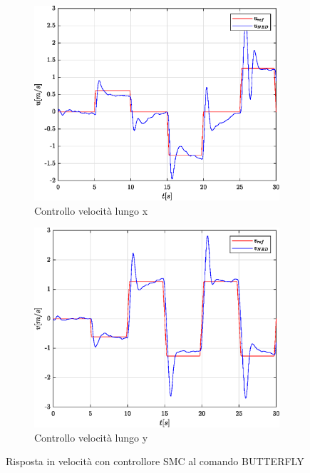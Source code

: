 \begin{figure}
	\centering
	\begin{subfigure}{0.45\textwidth}
		\centering
		\includegraphics[width=1\textwidth]{Simulazioni/Figure/SMC/BUTTERFLY/PositionControlXVel}
		\caption{Controllo velocità lungo x}
		\label{fig:BUTTERFLYerrvelxSMC}
	\end{subfigure}
	\hfill
	\begin{subfigure}{0.45\textwidth}
		\centering
		\includegraphics[width=1\textwidth]{Simulazioni/Figure/SMC/BUTTERFLY/PositionControlYVel}
		\caption{Controllo velocità lungo y}
		\label{fig:BUTTERFLYerrvelySMC}
	\end{subfigure}
	\caption{Risposta in velocità con controllore SMC al comando BUTTERFLY}
\end{figure}

